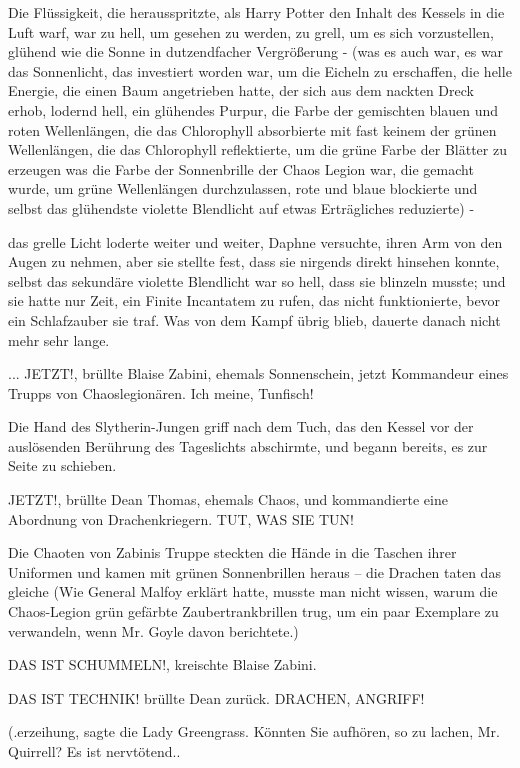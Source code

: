 Die Flüssigkeit, die herausspritzte, als Harry Potter den Inhalt des Kessels in
die Luft warf, war zu hell, um gesehen zu werden, zu grell, um es sich
vorzustellen, glühend wie die Sonne in dutzendfacher Vergrößerung - (was es auch
war, es war das Sonnenlicht, das investiert worden war, um die Eicheln zu
erschaffen, die helle Energie, die einen Baum angetrieben hatte, der sich aus
dem nackten Dreck erhob, lodernd hell, ein glühendes Purpur, die Farbe der
gemischten blauen und roten Wellenlängen, die das Chlorophyll absorbierte mit
fast keinem der grünen Wellenlängen, die das Chlorophyll reflektierte, um die
grüne Farbe der Blätter zu erzeugen was die Farbe der Sonnenbrille der Chaos
Legion war, die gemacht wurde, um grüne Wellenlängen durchzulassen, rote und
blaue blockierte und selbst das glühendste violette Blendlicht auf etwas
Erträgliches reduzierte) -

das grelle Licht loderte weiter und weiter, Daphne versuchte, ihren Arm von den
Augen zu nehmen, aber sie stellte fest, dass sie nirgends direkt hinsehen
konnte, selbst das sekundäre violette Blendlicht war so hell, dass sie blinzeln
musste; und sie hatte nur Zeit, ein Finite Incantatem zu rufen, das nicht
funktionierte, bevor ein Schlafzauber sie traf. Was von dem Kampf übrig blieb,
dauerte danach nicht mehr sehr lange.

... \glqq{}JETZT!\grqq{}, brüllte Blaise Zabini, ehemals Sonnenschein, jetzt
Kommandeur eines Trupps von Chaoslegionären. \glqq{}Ich meine, Tunfisch!\grqq{}

Die Hand des Slytherin-Jungen griff nach dem Tuch, das den Kessel vor der
auslösenden Berührung des Tageslichts abschirmte, und begann bereits, es zur
Seite zu schieben.

\glqq{}JETZT!\grqq{}, brüllte Dean Thomas, ehemals Chaos, und kommandierte eine
Abordnung von Drachenkriegern. \glqq{}TUT, WAS SIE TUN!\grqq{}

Die Chaoten von Zabinis Truppe steckten die Hände in die Taschen ihrer Uniformen
und kamen mit grünen Sonnenbrillen heraus – die Drachen taten das gleiche (Wie
General Malfoy erklärt hatte, musste man nicht wissen, warum die Chaos-Legion
grün gefärbte Zaubertrankbrillen trug, um ein paar Exemplare zu verwandeln, wenn
Mr. Goyle davon berichtete.)

\glqq{}DAS IST SCHUMMELN!\grqq{}, kreischte Blaise Zabini.

\glqq{}DAS IST TECHNIK!\grqq{} brüllte Dean zurück. \glqq{}DRACHEN, ANGRIFF!\grqq{}

(\grqq{}.erzeihung\grqq{}, sagte die Lady Greengrass. \glqq{}Könnten Sie
aufhören, so zu lachen, Mr. Quirrell? Es ist nervtötend.\grqq{}.

